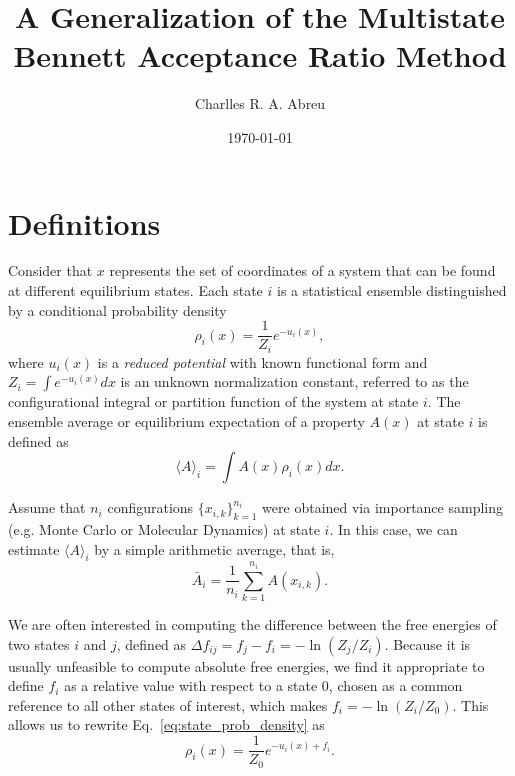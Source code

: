 \documentclass[aip,jcp,reprint,amsmath,amssymb]{revtex4-1}
\begin{document}
\title{A Generalization of the Multistate Bennett Acceptance Ratio Method}

\author{Charlles R. A. Abreu}

\date{\today}

\maketitle

\section{Definitions}
\label{sec:definitions}

Consider that $x$ represents the set of coordinates of a system that can be found at different equilibrium states. Each state $i$ is a statistical ensemble distinguished by a conditional probability density
\begin{equation}
\label{eq:state_prob_density}
\rho_i(x) = \frac{1}{Z_i} e^{-u_i(x)},
\end{equation}
where $u_i(x)$ is a \textit{reduced potential}\cite{Shirts_2008, Chodera_2011} with known functional form and $Z_i = \int e^{-u_i(x)}dx$ is an unknown normalization constant, referred to as the configurational integral or partition function of the system at state $i$. The ensemble average or equilibrium expectation of a property $A(x)$ at state $i$ is defined as
\begin{equation}
\label{eq:ensemble-average}
\langle A \rangle_i = \int A(x)\rho_i(x)dx.
\end{equation}

Assume that $n_i$ configurations $\{x_{i,k}\}_{k=1}^{n_i}$ were obtained via importance sampling\cite{Allen_1987} (e.g. Monte Carlo or Molecular Dynamics) at state $i$. In this case, we can estimate $\langle A \rangle_i$ by a simple arithmetic average, that is,
\begin{equation}
\label{eq:average_estimator}
\bar A_i = \frac{1}{n_i} \sum_{k=1}^{n_i} A(x_{i,k}).
\end{equation}

We are often interested in computing the difference between the free energies of two states $i$ and $j$, defined as $\Delta f_{ij} = f_j - f_i = - \ln (Z_j/Z_i)$. Because it is usually unfeasible to compute absolute free energies, we find it appropriate to define $f_i$ as a relative value with respect to a state $0$, chosen as a common reference to all other states of interest, which makes $f_i = -\ln (Z_i/Z_0)$. This allows us to rewrite Eq.~\eqref{eq:state_prob_density} as
\begin{equation}
\label{eq:state_prob_density_Z0}
\rho_i(x) = \frac{1}{Z_0} e^{-u_i(x)+ f_i}.
\end{equation}
\end{document}
